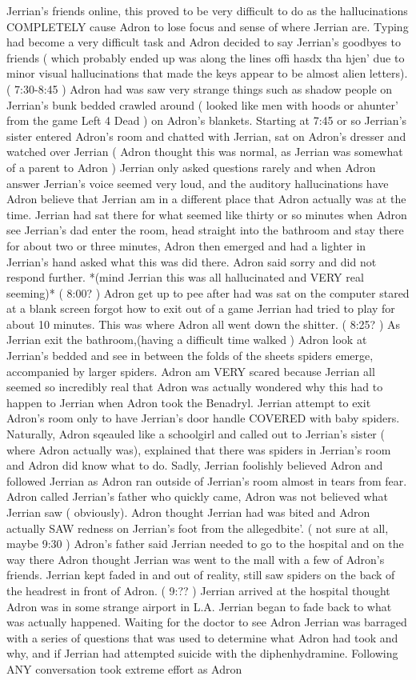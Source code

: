 \documentclass[12pt]{book}
\begin{document}
Jerrian's friends online, this proved to be very difficult to do as the hallucinations COMPLETELY cause Adron to lose focus and sense of where Jerrian are. Typing had become a very difficult task and Adron decided to say Jerrian's goodbyes to friends ( which probably ended up was along the lines offi hasdx tha hjen' due to minor visual hallucinations that made the keys appear to be almost alien letters). ( 7:30-8:45 ) Adron had was saw very strange things such as shadow people on Jerrian's bunk bedded crawled around ( looked like men with hoods or ahunter' from the game Left 4 Dead ) on Adron's blankets. Starting at 7:45 or so Jerrian's sister entered Adron's room and chatted with Jerrian, sat on Adron's dresser and watched over Jerrian ( Adron thought this was normal, as Jerrian was somewhat of a parent to Adron ) Jerrian only asked questions rarely and when Adron answer Jerrian's voice seemed very loud, and the auditory hallucinations have Adron believe that Jerrian am in a different place that Adron actually was at the time. Jerrian had sat there for what seemed like thirty or so minutes when Adron see Jerrian's dad enter the room, head straight into the bathroom and stay there for about two or three minutes, Adron then emerged and had a lighter in Jerrian's hand asked what this was did there. Adron said sorry and did not respond further. *(mind Jerrian this was all hallucinated and VERY real seeming)* ( 8:00? ) Adron get up to pee after had was sat on the computer stared at a blank screen forgot how to exit out of a game Jerrian had tried to play for about 10 minutes. This was where Adron all went down the shitter. ( 8:25? ) As Jerrian exit the bathroom,(having a difficult time walked ) Adron look at Jerrian's bedded and see in between the folds of the sheets spiders emerge, accompanied by larger spiders. Adron am VERY scared because Jerrian all seemed so incredibly real that Adron was actually wondered why this had to happen to Jerrian when Adron took the Benadryl. Jerrian attempt to exit Adron's room only to have Jerrian's door handle COVERED with baby spiders. Naturally, Adron sqeauled like a schoolgirl and called out to Jerrian's sister ( where Adron actually was), explained that there was spiders in Jerrian's room and Adron did know what to do. Sadly, Jerrian foolishly believed Adron and followed Jerrian as Adron ran outside of Jerrian's room almost in tears from fear. Adron called Jerrian's father who quickly came, Adron was not believed what Jerrian saw ( obviously). Adron thought Jerrian had was bited and Adron actually SAW redness on Jerrian's foot from the allegedbite'. ( not sure at all, maybe 9:30 ) Adron's father said Jerrian needed to go to the hospital and on the way there Adron thought Jerrian was went to the mall with a few of Adron's friends. Jerrian kept faded in and out of reality, still saw spiders on the back of the headrest in front of Adron. ( 9:?? ) Jerrian arrived at the hospital thought Adron was in some strange airport in L.A. Jerrian began to fade back to what was actually happened. Waiting for the doctor to see Adron Jerrian was barraged with a series of questions that was used to determine what Adron had took and why, and if Jerrian had attempted suicide with the diphenhydramine. Following ANY conversation took extreme effort as Adron 
\end{document}
